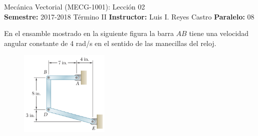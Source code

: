 \documentclass[ a4paper, twoside, 11pt]{article}
\newcommand{\numero}{02}
\begin{document}
\allowdisplaybreaks

\begin{center}
\Large Mec\'anica Vectorial (MECG-1001): Lecci\'on \numero \\[2ex]
\small \textbf{Semestre:} 2017-2018 T\'ermino II \qquad
\textbf{Instructor:} Luis I. Reyes Castro \qquad
\textbf{Paralelo:} 08
\end{center}
\fullskip

\begin{problem}
En el ensamble mostrado en la siguiente figura la barra $AB$ tiene una velocidad angular constante de 4 rad/s en el sentido de las manecillas del reloj. 

\begin{figure}[htb]
\centering
\includegraphics[width=0.38\textwidth]{problema-01.jpg}
\end{figure}


\end{problem}
\end{document}
